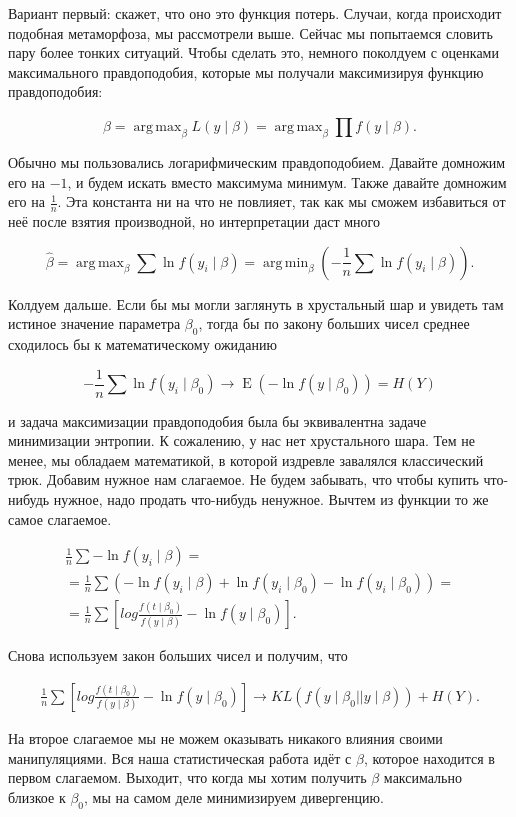 \documentclass[12pt, a4paper, oneside]{extreport}
\DeclareMathOperator*{\argmin}{arg\,min}
\DeclareMathOperator*{\argmax}{arg\,max}
\DeclareMathOperator{\E}{\mathop{E}}
\def \hb{\hat{\beta}}
\def \b{\beta}
\theoremstyle{plain}              %
\theoremstyle{definition}         %
\begin{document}
Вариант первый: скажет, что оно это функция потерь. Случаи, когда происходит подобная метаморфоза, мы рассмотрели выше. Сейчас мы попытаемся словить пару более тонких ситуаций.  Чтобы сделать это, немного поколдуем с оценками максимального правдоподобия, которые мы получали максимизируя функцию правдоподобия: 

\[ \hb = \argmax_{\b} L(y \mid \b)  = \argmax_{\b} \prod f(y \mid \b).\]

Обычно мы пользовались логарифмическим правдоподобием. Давайте домножим его на $-1$, и будем искать вместо максимума минимум. Также давайте домножим его на $\frac{1}{n}$. Эта константа ни на что не повлияет, так как мы сможем избавиться от неё после взятия производной, но интерпретации даст много

\[ \hb =\argmax_{\b} \sum \ln f(y_i \mid \b)  =  \argmin_{\b}  \left( -\frac{1}{n} \sum \ln f(y_i \mid \b)  \right).\]

Колдуем дальше. Если бы мы могли заглянуть в хрустальный шар и увидеть там истиное значение параметра $\b_0$, тогда бы по закону больших чисел среднее сходилось бы к математическому ожиданию

\[ -\frac{1}{n} \sum \ln f(y_i \mid \b_0) \to \E(- \ln f(y \mid \b_0)) = H(Y)\]

и задача максимизации правдоподобия была бы эквивалентна задаче минимизации энтропии. К сожалению, у нас нет хрустального шара. Тем не менее, мы обладаем математикой, в которой издревле завалялся классический трюк. Добавим нужное нам слагаемое. Не будем забывать, что чтобы купить что-нибудь нужное, надо продать что-нибудь ненужное. Вычтем из функции то же самое слагаемое. 

\begin{multline*}
\frac{1}{n} \sum -\ln f(y_i \mid \b) = \\ =  \frac{1}{n} \sum (-\ln f(y_i \mid \b) + \ln f(y_i \mid \b_0) - \ln f(y_i \mid \b_0) ) = \\  = \frac{1}{n} \sum \left[log \frac{f(t \mid \b_0)}{f(y \mid \b)} - \ln f(y \mid \b_0) \right].
\end{multline*}

Снова используем закон больших чисел и получим, что 

\begin{multline*}
\frac{1}{n} \sum \left[log \frac{f(t \mid \b_0)}{f(y \mid \b)} - \ln f(y \mid \b_0) \right] \to KL(f(y \mid \b_0 || y \mid \b)) + H(Y).
\end{multline*}

На второе слагаемое мы не можем оказывать никакого влияния своими манипуляциями. Вся наша статистическая работа идёт с $\b$, которое находится в первом слагаемом.  Выходит, что когда мы хотим получить $\b$ максимально близкое к $\b_0$, мы на самом деле минимизируем дивергенцию. 
\end{document}

